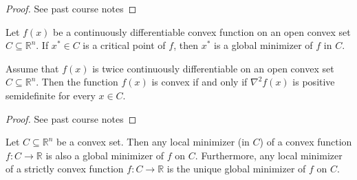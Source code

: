 \begin{proof}[Proof]
    See past course notes
\end{proof}
\begin{corollary}
    Let $f(x)$ be a continuously differentiable convex function on an open convex set $C \subseteq \mathbb R^n$. If $x^* \in C$ is a critical point of $f$, then $x^*$ is a global minimizer of $f$ in $C$.
\end{corollary}
\begin{theorem}
    Assume that $f(x)$ is twice continuously differentiable on an open convex set $C \subseteq \mathbb R^n$. Then the function $f(x)$ is convex if and only if $\nabla^2 f(x)$ is positive semidefinite for every $x \in C$.
\end{theorem}
\begin{proof}[Proof]
    See past course notes
\end{proof}
\begin{theorem}[]
    Let $C \subseteq \mathbb R^n$ be a convex set. Then any local minimizer (in $C$) of a convex function $f: C \to \mathbb R$ is also a global minimizer of $f$ on $C$. Furthermore, any local minimizer of a strictly convex function $f: C \to \mathbb R$ is the unique global minimizer of $f$ on $C$.
\end{theorem}